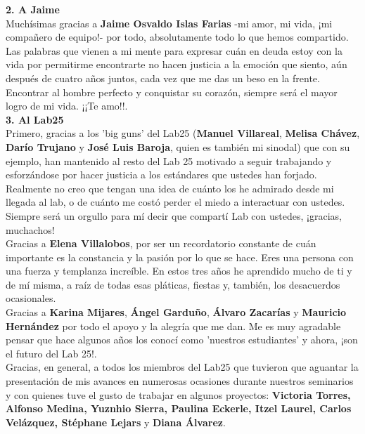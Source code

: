 \documentclass[
12pt, %
spanish, %
onehalfspacing, %
headsepline, %
]{MastersDoctoralThesis} %
\begin{document}
\begin{acknowledgements}
\textbf{2. A Jaime}\\

Muchísimas gracias a \textbf{Jaime Osvaldo Islas Farias} -mi amor, mi vida, ¡mi compañero de equipo!- por todo, absolutamente todo lo que hemos compartido. Las palabras que vienen a mi mente para expresar cuán en deuda estoy con la vida por permitirme encontrarte no hacen justicia a la emoción que siento, aún después de cuatro años juntos, cada vez que me das un beso en la frente. Encontrar al hombre perfecto y conquistar su corazón, siempre será el mayor logro de mi vida. ¡¡Te amo!!.\\


\textbf{3. Al Lab25}\\

Primero, gracias a los 'big guns' del Lab25 (\textbf{Manuel Villareal}, \textbf{Melisa Chávez}, \textbf{Darío Trujano} y \textbf{José Luis Baroja}, quien es también mi sinodal) que con su ejemplo, han mantenido al resto del Lab 25 motivado a seguir trabajando y esforzándose por hacer justicia a los estándares que ustedes han forjado. Realmente no creo que tengan una idea de cuánto los he admirado desde mi llegada al lab, o de cuánto me costó perder el miedo a interactuar con ustedes. Siempre será un orgullo para mí decir que compartí Lab con ustedes, ¡gracias, muchachos!\\

Gracias a \textbf{Elena Villalobos}, por ser un recordatorio constante de cuán importante es la constancia y la pasión por lo que se hace. Eres una persona con una fuerza y templanza increíble. En estos tres años he aprendido mucho de ti y de mí misma, a raíz de todas esas pláticas, fiestas y, también, los desacuerdos ocasionales.\\

Gracias a \textbf{Karina Mijares}, \textbf{Ángel Garduño}, \textbf{Álvaro Zacarías} y \textbf{Mauricio Hernández} por todo el apoyo y la alegría que me dan. Me es muy agradable pensar que hace algunos años los conocí como 'nuestros estudiantes' y ahora, ¡son el futuro del Lab 25!.\\

Gracias, en general, a todos los miembros del Lab25 que tuvieron que aguantar la presentación de mis avances en numerosas ocasiones durante nuestros seminarios y con quienes tuve el gusto de trabajar en algunos proyectos: \textbf{Victoria Torres, Alfonso Medina, Yuznhio Sierra, Paulina Eckerle, Itzel Laurel, Carlos Velázquez,  Stéphane Lejars} y \textbf{Diana Álvarez}.\\


\end{acknowledgements}
\end{document}
